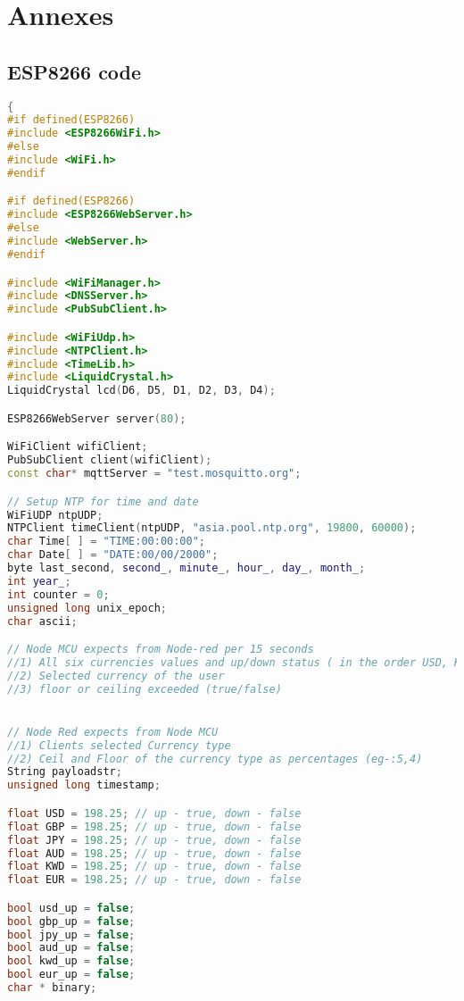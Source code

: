 \newpage
\section{Annexes}

\subsection{ESP8266 code}
                
\begin{lstlisting}[language=C++]
{
#if defined(ESP8266)
#include <ESP8266WiFi.h>          
#else
#include <WiFi.h>          
#endif

#if defined(ESP8266)
#include <ESP8266WebServer.h>
#else
#include <WebServer.h>
#endif

#include <WiFiManager.h> 
#include <DNSServer.h>
#include <PubSubClient.h>

#include <WiFiUdp.h>
#include <NTPClient.h>               
#include <TimeLib.h>                 
#include <LiquidCrystal.h>  
LiquidCrystal lcd(D6, D5, D1, D2, D3, D4); 

ESP8266WebServer server(80);

WiFiClient wifiClient;
PubSubClient client(wifiClient); 
const char* mqttServer = "test.mosquitto.org";

// Setup NTP for time and date
WiFiUDP ntpUDP;
NTPClient timeClient(ntpUDP, "asia.pool.ntp.org", 19800, 60000);
char Time[ ] = "TIME:00:00:00";
char Date[ ] = "DATE:00/00/2000";
byte last_second, second_, minute_, hour_, day_, month_;
int year_;
int counter = 0;
unsigned long unix_epoch;
char ascii;

// Node MCU expects from Node-red per 15 seconds
//1) All six currencies values and up/down status ( in the order USD, KWD, AUD, EUR, JPY, GBP)
//2) Selected currency of the user
//3) floor or ceiling exceeded (true/false)


// Node Red expects from Node MCU
//1) Clients selected Currency type
//2) Ceil and Floor of the currency type as percentages (eg-:5,4)
String payloadstr;
unsigned long timestamp;

float USD = 198.25; // up - true, down - false
float GBP = 198.25; // up - true, down - false
float JPY = 198.25; // up - true, down - false
float AUD = 198.25; // up - true, down - false
float KWD = 198.25; // up - true, down - false
float EUR = 198.25; // up - true, down - false

bool usd_up = false;
bool gbp_up = false;
bool jpy_up = false;
bool aud_up = false;
bool kwd_up = false;
bool eur_up = false;
char * binary;


\end{lstlisting}
